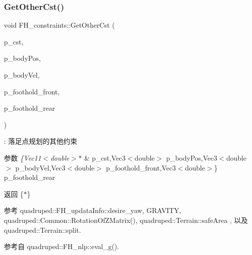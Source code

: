 \subsubsection{\texorpdfstring{Get\+Other\+Cst()}{GetOtherCst()}}
{\footnotesize\ttfamily void F\+H\+\_\+constraints\+::\+Get\+Other\+Cst (\begin{DoxyParamCaption}\item[{\hyperlink{cppTypes_8h_a7da3a7544c01fdbd4b509c1c25cc0b3d}{Vec23}$<$ double $>$ $\ast$}]{p\+\_\+cst,  }\item[{\hyperlink{cppTypes_8h_a65c27bf97693676535dd0b30ea0ad399}{Vec3}$<$ double $>$}]{p\+\_\+body\+Pos,  }\item[{\hyperlink{cppTypes_8h_a65c27bf97693676535dd0b30ea0ad399}{Vec3}$<$ double $>$}]{p\+\_\+body\+Vel,  }\item[{\hyperlink{cppTypes_8h_a65c27bf97693676535dd0b30ea0ad399}{Vec3}$<$ double $>$}]{p\+\_\+foothold\+\_\+front,  }\item[{\hyperlink{cppTypes_8h_a65c27bf97693676535dd0b30ea0ad399}{Vec3}$<$ double $>$}]{p\+\_\+foothold\+\_\+rear }\end{DoxyParamCaption})}

\+: 落足点规划的其他约束 
\begin{DoxyParams}{参数}
{\em \{\+Vec11$<$double$>$$\ast$} & p\+\_\+cst,Vec3$<$double$>$ p\+\_\+body\+Pos,Vec3$<$double$>$ p\+\_\+body\+Vel,Vec3$<$double$>$ p\+\_\+foothold\+\_\+front,Vec3$<$double$>$\} p\+\_\+foothold\+\_\+rear \\
\hline
\end{DoxyParams}
\begin{DoxyReturn}{返回}
\{$\ast$\} 
\end{DoxyReturn}


参考 quadruped\+::\+F\+H\+\_\+updata\+Info\+::desire\+\_\+yaw, G\+R\+A\+V\+I\+TY, quadruped\+::\+Common\+::\+Rotation\+Of\+Z\+Matrix(), quadruped\+::\+Terrain\+::safe\+Area , 以及 quadruped\+::\+Terrain\+::split.



参考自 quadruped\+::\+F\+H\+\_\+nlp\+::eval\+\_\+g().

\mbox{\label{classquadruped_1_1FH__constraints_ab13f56338e24832060644a96c86b15f7}} 
